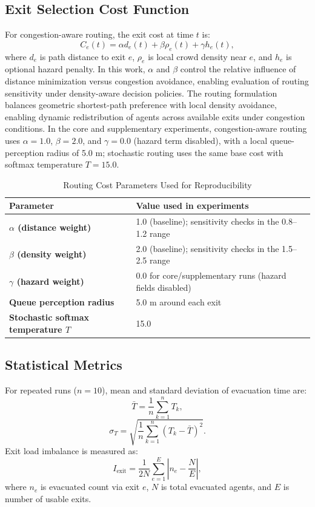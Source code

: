\documentclass[utf8]{FrontiersinHarvard}
\begin{document}
\subsection{Exit Selection Cost Function}
For congestion-aware routing, the exit cost at time $t$ is:
\begin{equation}
    C_e(t)=\alpha d_e(t)+\beta \rho_e(t)+\gamma h_e(t),
    \label{eq:cost}
\end{equation}
where $d_e$ is path distance to exit $e$, $\rho_e$ is local crowd density near $e$, and $h_e$ is optional hazard penalty. In this work, $\alpha$ and $\beta$ control the relative influence of distance minimization versus congestion avoidance, enabling evaluation of routing sensitivity under density-aware decision policies. The routing formulation balances geometric shortest-path preference with local density avoidance, enabling dynamic redistribution of agents across available exits under congestion conditions. In the core and supplementary experiments, congestion-aware routing uses $\alpha=1.0$, $\beta=2.0$, and $\gamma=0.0$ (hazard term disabled), with a local queue-perception radius of 5.0 m; stochastic routing uses the same base cost with softmax temperature $T=15.0$.

\begin{table}[t]
\centering
\caption{Routing Cost Parameters Used for Reproducibility}
\label{tab:routing_params}
{\footnotesize
\setlength{\tabcolsep}{3pt}
\begin{tabular}{>{\bfseries}p{2.0cm} p{4.8cm}}
\toprule
Parameter & Value used in experiments \\
\midrule
$\alpha$ (distance weight) & 1.0 (baseline); sensitivity checks in the 0.8--1.2 range \\
$\beta$ (density weight) & 2.0 (baseline); sensitivity checks in the 1.5--2.5 range \\
$\gamma$ (hazard weight) & 0.0 for core/supplementary runs (hazard fields disabled) \\
Queue perception radius & 5.0 m around each exit \\
Stochastic softmax temperature $T$ & 15.0 \\
\bottomrule
\end{tabular}
}
\end{table}

\subsection{Statistical Metrics}
For repeated runs ($n=10$), mean and standard deviation of evacuation time are:
\begin{equation}
    \bar{T}=\frac{1}{n}\sum_{k=1}^{n}T_k,
\end{equation}
\begin{equation}
    \sigma_T=\sqrt{\frac{1}{n}\sum_{k=1}^{n}(T_k-\bar{T})^2}.
\end{equation}
Exit load imbalance is measured as:
\begin{equation}
    I_{\mathrm{exit}}=\frac{1}{2N}\sum_{e=1}^{E}\left|n_e-\frac{N}{E}\right|,
\end{equation}
where $n_e$ is evacuated count via exit $e$, $N$ is total evacuated agents, and $E$ is number of usable exits.
\end{document}
